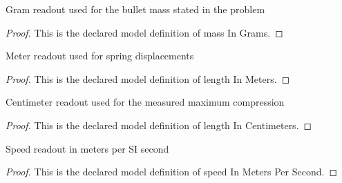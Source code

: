 \begin{definition}
  \label{def:physics:phyx-mini-0202:phyxminiproblems-problemphyxmini0202-massingrams}
  Gram readout used for the bullet mass stated in the problem
\end{definition}
\begin{proof}
  This is the declared model definition of mass In Grams.
\end{proof}
\begin{definition}
  \label{def:physics:phyx-mini-0202:phyxminiproblems-problemphyxmini0202-lengthinmeters}
  Meter readout used for spring displacements
\end{definition}
\begin{proof}
  This is the declared model definition of length In Meters.
\end{proof}
\begin{definition}
  \label{def:physics:phyx-mini-0202:phyxminiproblems-problemphyxmini0202-lengthincentimeters}
  Centimeter readout used for the measured maximum compression
\end{definition}
\begin{proof}
  This is the declared model definition of length In Centimeters.
\end{proof}
\begin{definition}
  \label{def:physics:phyx-mini-0202:phyxminiproblems-problemphyxmini0202-speedinmeterspersecond}
  Speed readout in meters per SI second
\end{definition}
\begin{proof}
  This is the declared model definition of speed In Meters Per Second.
\end{proof}
